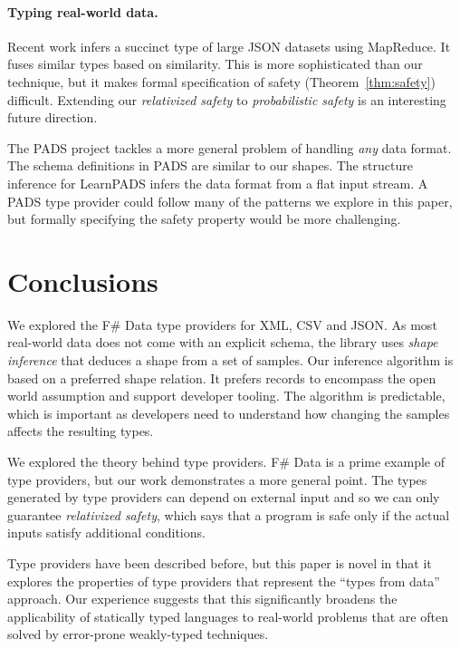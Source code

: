 \documentclass[10pt,preprint,clearpagebib]{sigplanconf}
\begin{document}
\paragraph{Typing real-world data.}
Recent work \cite{typing-json} infers a succinct type of large JSON datasets using MapReduce.
It fuses similar types based on similarity. This is more sophisticated than our technique, but it 
makes formal specification of safety (Theorem~\ref{thm:safety}) difficult. Extending our 
\emph{relativized safety} to \emph{probabilistic safety} is an interesting future direction.

The PADS project \cite{pads-dsl,pads-ml} tackles a more general problem of handling \emph{any} data format.
The schema definitions in PADS are similar to our shapes. The structure inference for LearnPADS
\cite{pads-learn} infers the data format from a flat input stream. A PADS type provider could follow
many of the patterns we explore in this paper, but formally specifying the safety property would be
more challenging.

\section{Conclusions}
\label{sec:conclusions}

We explored the F\# Data type providers for XML, CSV and JSON. As most real-world data does not come 
with an explicit schema, the library uses \emph{shape inference} that deduces a shape from a set of 
samples. Our inference algorithm is based on a preferred shape relation. It prefers records to 
encompass the open world assumption and support developer tooling. The algorithm is predictable, which is 
important as developers need to understand how changing the samples affects the resulting types.

We explored the theory behind type providers. F\# Data is a prime example of 
type providers, but our work demonstrates a more general point. The types generated by type 
providers can depend on external input and so we can only guarantee \emph{relativized safety}, 
which says that a program is safe only if the actual inputs satisfy additional conditions.

Type providers have been described before, but this paper is novel in that it explores the 
properties of type providers that represent the ``types from data'' approach. Our experience suggests 
that this significantly broadens the applicability of statically typed languages to real-world 
problems that are often solved by error-prone weakly-typed techniques.




\end{document}
